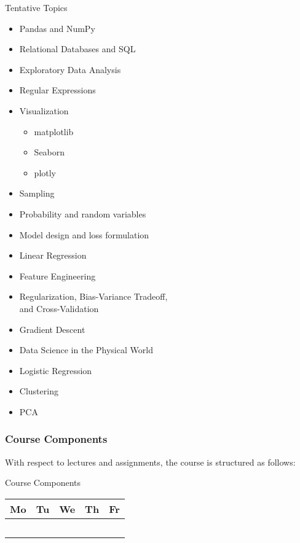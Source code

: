 \documentclass[openany]{book}
\begin{document}
\begin{miscbox}{Tentative Topics}
	\begin{multicols}{2}
		\begin{itemize}
			\item Pandas and NumPy
			\item Relational Databases and SQL
			\item Exploratory Data Analysis
			\item Regular Expressions
			\item Visualization
			\begin{itemize}
				\item matplotlib
				\item Seaborn
				\item plotly
			\end{itemize}
			\item Sampling
			\item Probability and random variables
			\item Model design and loss formulation
			\item Linear Regression
			\item Feature Engineering
			\item Regularization, Bias-Variance Tradeoff,\\and Cross-Validation
			\item Gradient Descent
			\item Data Science in the Physical World
			\item Logistic Regression
			\item Clustering
			\item PCA
		\end{itemize}
	\end{multicols}
\end{miscbox}

\subsubsection{Course Components}
With respect to lectures and assignments, the course is structured as follows:
\begin{miscbox}{Course Components}
	\centering
	\begin{center}
		\begin{tabularx}{\textwidth}{Y|Y|Y|Y|Y}
			\textbf{Mo} & \textbf{Tu} & \textbf{We} & \textbf{Th} & \textbf{Fr} \\
			\hline
			& \color{darkgreen}{Live Lecture} & & \color{darkgreen}{Live Lecture} & \\
			\hline
			& \color{darkblue}{Discussion} & \color{darkblue}{Discussion} & & \\
			\hline
			& \color{darkgray}{Office Hours} & \color{darkgray}{Office Hours} & \color{darkgray}{Office Hours} & \color{darkgray}{Office Hours} \\
			\hline
			& & &  & \color{darkred}{Homework N released} \\
			\hline
			&  & & & \color{darkred}{Lab N released}
		\end{tabularx}
	\end{center}
\end{miscbox}
\end{document}
